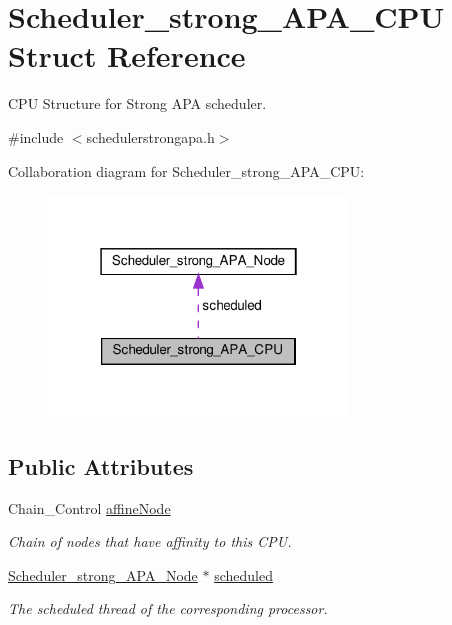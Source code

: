 \hypertarget{structScheduler__strong__APA__CPU}{}\section{Scheduler\+\_\+strong\+\_\+\+A\+P\+A\+\_\+\+C\+PU Struct Reference}
\label{structScheduler__strong__APA__CPU}


C\+PU Structure for Strong A\+PA scheduler.  




{\ttfamily \#include $<$schedulerstrongapa.\+h$>$}



Collaboration diagram for Scheduler\+\_\+strong\+\_\+\+A\+P\+A\+\_\+\+C\+PU\+:\nopagebreak
\begin{figure}[H]
\begin{center}
\leavevmode
\includegraphics[width=226pt]{structScheduler__strong__APA__CPU__coll__graph}
\end{center}
\end{figure}
\subsection*{Public Attributes}
\begin{DoxyCompactItemize}
\item 
Chain\+\_\+\+Control \hyperlink{structScheduler__strong__APA__CPU_adf4eebd8db4f5b52fdfe7b352c8bddc7}{affine\+Node}
\begin{DoxyCompactList}\small\item\em Chain of nodes that have affinity to this C\+PU. \end{DoxyCompactList}\item 
\hyperlink{structScheduler__strong__APA__Node}{Scheduler\+\_\+strong\+\_\+\+A\+P\+A\+\_\+\+Node} $\ast$ \hyperlink{structScheduler__strong__APA__CPU_aa2f3c81477c08ef4188e5e24f054dffb}{scheduled}
\begin{DoxyCompactList}\small\item\em The scheduled thread of the corresponding processor. \end{DoxyCompactList}\end{DoxyCompactItemize}


